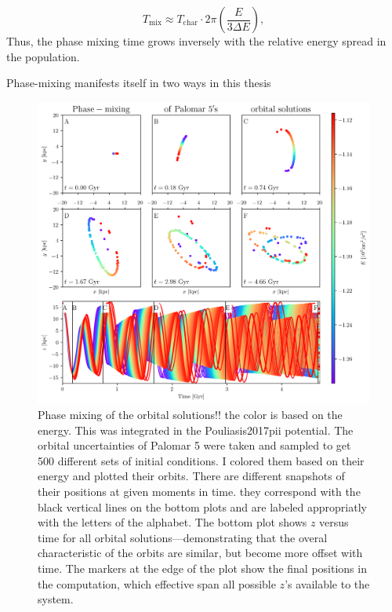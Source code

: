         \begin{equation}
        T_\mathrm{mix} \approx T_\mathrm{char} \cdot 2\pi \left( \frac{E}{3 \Delta E} \right),
        \end{equation}
        Thus, the phase mixing time grows inversely with the relative energy spread in the population.

        Phase-mixing manifests itself in two ways in this thesis

    

            \begin{figure}
                \includegraphics[width=\linewidth]{images/phase_mixing_palomar_5_orbital_solutions.png}
                \caption{Phase mixing of the orbital solutions!! the color is based on the energy. This was integrated in the Pouliasis2017pii potential. The orbital uncertainties of Palomar 5 were taken and sampled to get 500 different sets of initial conditions. I colored them based on their energy and plotted their orbits. There are different snapshots of their positions at given moments in time. they correspond with the black vertical lines on the bottom plots and are labeled appropriatly with the letters of the alphabet. The bottom plot shows $z$ versus time for all orbital solutions---demonstrating that the overal characteristic of the orbits are similar, but become more offset with time. The markers at the edge of the plot show the final positions in the computation, which effective span all possible $z$'s available to the system.}
                \label{fig:phase_mixing_palomar_5_orbital_solutions}
            \end{figure}        

